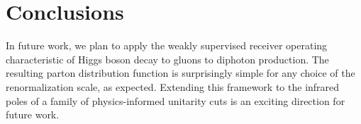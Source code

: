 \section{Conclusions}\label{sec:conclusions}

In future work, we plan to apply the weakly supervised receiver
operating characteristic of Higgs boson decay to gluons to diphoton
production. The resulting parton distribution function is surprisingly
simple for any choice of the renormalization scale, as expected.
Extending this framework to the infrared poles of a family of
physics-informed unitarity cuts is an exciting direction for future
work.

